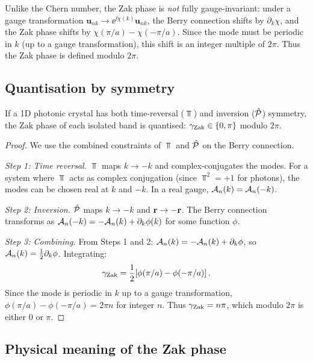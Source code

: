 Unlike the Chern number, the Zak phase is \emph{not} fully
gauge-invariant: under a gauge transformation
$\mathbf{u}_{nk}\to\ee^{\ii\chi(k)}\mathbf{u}_{nk}$, the Berry
connection shifts by $\partial_k\chi$, and the Zak phase shifts by
$\chi(\pi/a)-\chi(-\pi/a)$.  Since the mode must be periodic in $k$
(up to a gauge transformation), this shift is an integer multiple of
$2\pi$.  Thus the Zak phase is defined modulo $2\pi$.

\subsection{Quantisation by symmetry}
\label{sec:ch14-zak-quantised}

\begin{proposition}
  If a 1D photonic crystal has both time-reversal ($\Top$) and
  inversion ($\hat{\mathcal{P}}$) symmetry, the Zak phase of each isolated band is
  quantised: $\gamma_{\mathrm{Zak}}\in\{0,\pi\}$ modulo $2\pi$.
\end{proposition}

\begin{proof}
We use the combined constraints of $\Top$ and $\hat{\mathcal{P}}$ on the Berry
connection.

\emph{Step 1: Time reversal.}  $\Top$ maps $k\to -k$ and
complex-conjugates the modes.  For a system where $\Top$ acts as
complex conjugation (since $\Top^2=+1$ for photons), the modes can be
chosen real at $k$ and $-k$.  In a real gauge,
$\mathcal{A}_n(k)=\mathcal{A}_n(-k)$.

\emph{Step 2: Inversion.}  $\hat{\mathcal{P}}$ maps $k\to -k$ and $\mathbf{r}\to-\mathbf{r}$.
The Berry connection transforms as
$\mathcal{A}_n(-k)=-\mathcal{A}_n(k)+\partial_k\phi(k)$ for some function
$\phi$.

\emph{Step 3: Combining.}  From Steps 1 and 2:
$\mathcal{A}_n(k)=-\mathcal{A}_n(k)+\partial_k\phi$, so
$\mathcal{A}_n(k)=\frac{1}{2}\partial_k\phi$.  Integrating:
\begin{equation}
  \gamma_{\mathrm{Zak}} = \frac{1}{2}[\phi(\pi/a)-\phi(-\pi/a)]\,.
\end{equation}
Since the mode is periodic in $k$ up to a gauge transformation,
$\phi(\pi/a)-\phi(-\pi/a)=2\pi n$ for integer $n$.  Thus
$\gamma_{\mathrm{Zak}}=n\pi$, which modulo $2\pi$ is either $0$ or $\pi$.
\end{proof}

\subsection{Physical meaning of the Zak phase}
\label{sec:ch14-zak-meaning}

